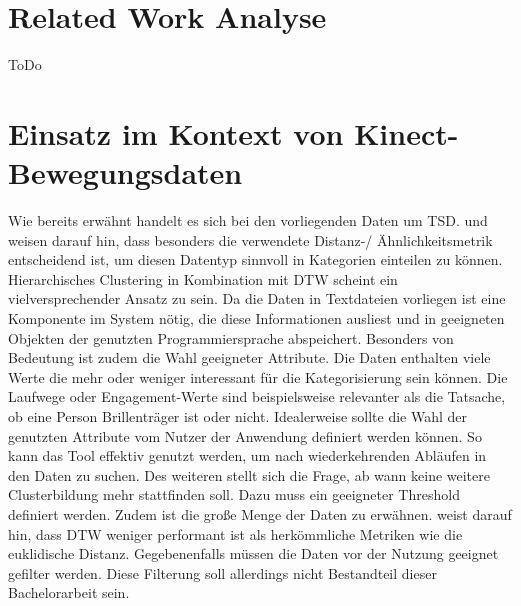 \section{Related Work Analyse}
\label{3-RelatedWork}
ToDo


\section{Einsatz im Kontext von Kinect-Bewegungsdaten}
\label{3-Einsatz}
Wie bereits erwähnt handelt es sich bei den vorliegenden Daten um \ac{TSD}.
\citet{warren_liao_clustering_2005} und \citet{aghabozorgi_time-series_2015} weisen darauf hin,
dass besonders die verwendete Distanz-/ Ähnlichkeitsmetrik entscheidend ist,
um diesen Datentyp sinnvoll in Kategorien einteilen zu können.
Hierarchisches Clustering in Kombination mit \ac{DTW} scheint ein vielversprechender Ansatz zu sein.
Da die Daten in Textdateien vorliegen ist eine Komponente im System nötig,
die diese Informationen ausliest und in geeigneten Objekten der genutzten Programmiersprache abspeichert.
Besonders von Bedeutung ist zudem die Wahl geeigneter Attribute.
Die Daten enthalten viele Werte die mehr oder weniger interessant für die Kategorisierung sein können.
Die Laufwege oder Engagement-Werte sind beispielsweise relevanter als die Tatsache,
ob eine Person Brillenträger ist oder nicht.
Idealerweise sollte die Wahl der genutzten Attribute vom Nutzer der Anwendung definiert werden können.
So kann das Tool effektiv genutzt werden, um nach wiederkehrenden Abläufen in den Daten zu suchen.
Des weiteren stellt sich die Frage, ab wann keine weitere Clusterbildung mehr stattfinden soll.
Dazu muss ein geeigneter Threshold definiert werden.
Zudem ist die große Menge der Daten zu erwähnen.
\citet{aghabozorgi_time-series_2015} weist darauf hin,
dass \ac{DTW} weniger performant ist als herkömmliche Metriken wie die euklidische Distanz.
Gegebenenfalls müssen die Daten vor der Nutzung geeignet gefilter werden.
Diese Filterung soll allerdings nicht Bestandteil dieser Bachelorarbeit sein.
